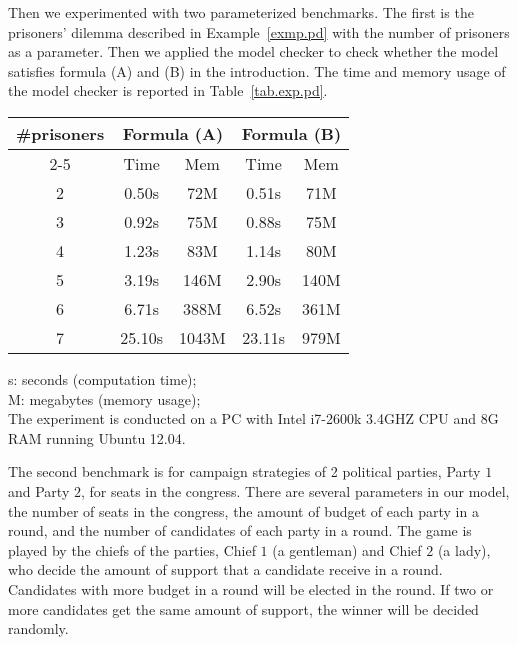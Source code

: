 \documentclass[11pt]{article}
\begin{document}
Then we experimented with two parameterized benchmarks.  
The first is the prisoners' dilemma described in Example~\ref{exmp.pd} 
with the number of prisoners as a parameter.  
Then we applied the model checker to check whether the model  
satisfies formula (A) and (B) in the introduction.
The time and memory usage of the model checker is reported in 
Table~\ref{tab.exp.pd}.
\begin{table*}[!th]
\caption{Experiment data for the prisoners' dilemma model}
\label{tab.exp.pd}
\begin{center}
\begin{tabular}{c||c|c||c|c} \hline
\multirow{2}{*}{\#prisoners}  &\multicolumn{2}{c||}{Formula (A)} & \multicolumn{2}{c}{Formula (B)}\\ \cline{2-5}
& Time & Mem  & Time & Mem\\ \hline
2 &0.50s &72M   &0.51s &71M \\
3 &0.92s &75M   &0.88s &75M \\
4 &1.23s &83M   &1.14s &80M \\
5 &3.19s &146M  &2.90s &140M \\
6 &6.71s &388M  &6.52s &361M \\
7 &25.10s&1043M &23.11s&979M \\ \hline
\end{tabular}
\hspace*{10mm}
\parbox{50mm}{
s: seconds (computation time); \\
M: megabytes (memory usage); \\[2mm]
The experiment is conducted on a PC with Intel i7-2600k 3.4GHZ CPU 
and 8G RAM running Ubuntu 12.04. 
}
\end{center}
\end{table*}

The second benchmark is for campaign strategies 
of 2 political parties, Party $1$ and Party $2$, for seats in 
the congress.  
There are several parameters in our model, 
the number of seats in the congress, 
the amount of budget of each party in a round, 
and the number of candidates of each party in a round. 
The game is played by the chiefs of the parties, 
Chief $1$ (a gentleman) and Chief $2$ (a lady), 
who decide the amount of support that 
a candidate receive in a round.   
Candidates with more budget in a round will be elected in the round. 
If two or more candidates get the same amount of support, 
the winner will be decided randomly.  
\end{document}
